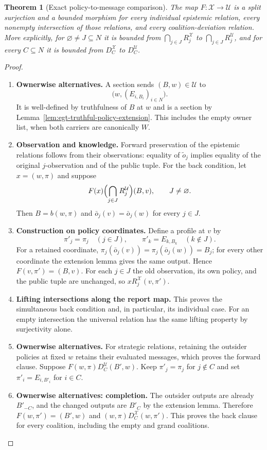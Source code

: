 \documentclass[11pt,a4paper]{article}
\numberwithin{equation}{section}
\newtheorem{theorem}{Theorem}[section]
\theoremstyle{definition}
\theoremstyle{remark}
\theoremstyle{plain}
\begin{document}
\begin{theorem}[Exact policy-to-message comparison]
\label{thm:egt-announcement-policy-comparison}
\label{agt-thm-message-comparison}
The map $F:\mathcal X\to\mathcal U$ is a split surjection and a bounded
morphism for every individual epistemic relation, every nonempty
intersection of those relations, and every coalition-deviation relation.
More explicitly, for $\varnothing\ne J\subseteq N$ it is bounded from
$\bigcap_{j\in J}R_j^{\mathcal X}$ to
$\bigcap_{j\in J}R_j^{\mathcal U}$, and for every $C\subseteq N$ it is
bounded from $D_C^{\mathcal X}$ to $D_C^{\mathcal U}$.
\end{theorem}
\begin{proof}
\leavevmode
\begin{enumerate}[label=\textup{(\arabic*)},leftmargin=*,itemsep=4pt,topsep=3pt]
  \item \textbf{Ownerwise alternatives.} A section sends $(B,w)\in\mathcal U$ to
\[
 \bigl(w,(E_{i,B_i})_{i\in N}\bigr).
\]
It is well-defined by truthfulness of $B$ at $w$ and is a section by
Lemma~\ref{lem:egt-truthful-policy-extension}. This includes the empty owner
list, when both carriers are canonically $W$.
  \item \textbf{Observation and knowledge.} Forward preservation of the epistemic relations follows from their
observations: equality of $\widetilde o_j$ implies equality of the original
$j$-observation and of the public tuple. For the back condition, let
$x=(w,\pi)$ and suppose
\[
 F(x)\Bigl(\bigcap_{j\in J}R_j^{\mathcal U}\Bigr)(B,v),
 \qquad J\ne\varnothing.
\]
Then $B=b(w,\pi)$ and $\bar o_j(v)=\bar o_j(w)$ for every $j\in J$.
  \item \textbf{Construction on policy coordinates.} Define a profile at $v$ by
\[
 \pi'_j=\pi_j\quad(j\in J),\qquad
 \pi'_k=E_{k,B_k}\quad(k\notin J).
\]
For a retained coordinate,
$\pi_j(\bar o_j(v))=\pi_j(\bar o_j(w))=B_j$; for every other coordinate
the extension lemma gives the same output. Hence $F(v,\pi')=(B,v)$. For each $j\in J$ the old observation, its own policy, and the public tuple
are unchanged, so $xR_j^{\mathcal X}(v,\pi')$.
  \item \textbf{Lifting intersections along the report map.} This proves the simultaneous
back condition and, in particular, its individual case. For an empty
intersection the universal relation has the same lifting property by
surjectivity alone.
  \item \textbf{Ownerwise alternatives.} For strategic relations, retaining the outsider policies at fixed $w$
retains their evaluated messages, which proves the forward clause. Suppose $F(w,\pi)D_C^{\mathcal U}(B',w)$. Keep
$\pi'_j=\pi_j$ for $j\notin C$ and set
$\pi'_i=E_{i,B'_i}$ for $i\in C$.
  \item \textbf{Ownerwise alternatives: completion.} The outsider outputs are already $B'_{-C}$, and the changed outputs are
$B'_C$ by the extension lemma. Therefore
$F(w,\pi')=(B',w)$ and
$(w,\pi)D_C^{\mathcal X}(w,\pi')$. This proves the back clause for every
coalition, including the empty and grand coalitions.
\end{enumerate}
\end{proof}
\end{document}
